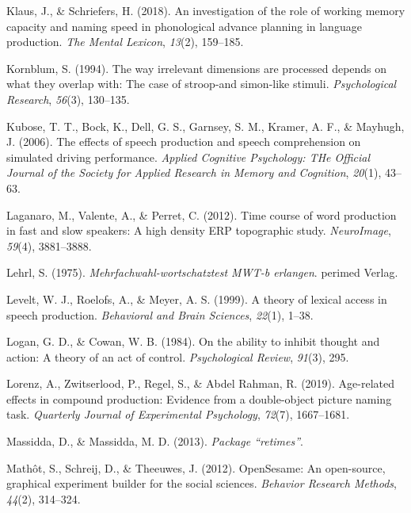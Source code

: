 \documentclass[
  man,floatsintext]{apa6}
\newlength{\cslhangindent}
\newlength{\cslentryspacingunit} %
\newenvironment{CSLReferences}[2] %
 {%
  \setlength{\parindent}{0pt}
  \ifodd #1
  \let\oldpar\par
  \def\par{\hangindent=\cslhangindent\oldpar}
  \fi
  \setlength{\parskip}{#2\cslentryspacingunit}
 }%
 {}
\begin{document}
\begin{CSLReferences}{1}{0}
\leavevmode{}%
Klaus, J., \& Schriefers, H. (2018). An investigation of the role of working memory capacity and naming speed in phonological advance planning in language production. \emph{The Mental Lexicon}, \emph{13}(2), 159--185.

\leavevmode{}%
Kornblum, S. (1994). The way irrelevant dimensions are processed depends on what they overlap with: The case of stroop-and simon-like stimuli. \emph{Psychological Research}, \emph{56}(3), 130--135.

\leavevmode{}%
Kubose, T. T., Bock, K., Dell, G. S., Garnsey, S. M., Kramer, A. F., \& Mayhugh, J. (2006). The effects of speech production and speech comprehension on simulated driving performance. \emph{Applied Cognitive Psychology: THe Official Journal of the Society for Applied Research in Memory and Cognition}, \emph{20}(1), 43--63.

\leavevmode{}%
Laganaro, M., Valente, A., \& Perret, C. (2012). Time course of word production in fast and slow speakers: A high density ERP topographic study. \emph{NeuroImage}, \emph{59}(4), 3881--3888.

\leavevmode{}%
Lehrl, S. (1975). \emph{Mehrfachwahl-wortschatztest MWT-b erlangen}. perimed Verlag.

\leavevmode{}%
Levelt, W. J., Roelofs, A., \& Meyer, A. S. (1999). A theory of lexical access in speech production. \emph{Behavioral and Brain Sciences}, \emph{22}(1), 1--38.

\leavevmode{}%
Logan, G. D., \& Cowan, W. B. (1984). On the ability to inhibit thought and action: A theory of an act of control. \emph{Psychological Review}, \emph{91}(3), 295.

\leavevmode{}%
Lorenz, A., Zwitserlood, P., Regel, S., \& Abdel Rahman, R. (2019). Age-related effects in compound production: Evidence from a double-object picture naming task. \emph{Quarterly Journal of Experimental Psychology}, \emph{72}(7), 1667--1681.

\leavevmode{}%
Massidda, D., \& Massidda, M. D. (2013). \emph{Package {``retimes''}}.

\leavevmode{}%
Mathôt, S., Schreij, D., \& Theeuwes, J. (2012). OpenSesame: An open-source, graphical experiment builder for the social sciences. \emph{Behavior Research Methods}, \emph{44}(2), 314--324.


\end{CSLReferences}
\end{document}
